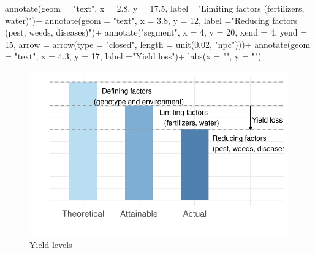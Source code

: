 \documentclass[
  letterpaper,
  DIV=11,
  numbers=noendperiod]{scrreprt}
\newenvironment{Shaded}{\begin{snugshade}}{\end{snugshade}}
\newcommand{\AttributeTok}[1]{\textcolor[rgb]{0.40,0.45,0.13}{#1}}
\newcommand{\DecValTok}[1]{\textcolor[rgb]{0.68,0.00,0.00}{#1}}
\newcommand{\FloatTok}[1]{\textcolor[rgb]{0.68,0.00,0.00}{#1}}
\newcommand{\FunctionTok}[1]{\textcolor[rgb]{0.28,0.35,0.67}{#1}}
\newcommand{\NormalTok}[1]{\textcolor[rgb]{0.00,0.23,0.31}{#1}}
\newcommand{\SpecialCharTok}[1]{\textcolor[rgb]{0.37,0.37,0.37}{#1}}
\newcommand{\StringTok}[1]{\textcolor[rgb]{0.13,0.47,0.30}{#1}}
\begin{document}
\begin{Shaded}
\begin{Highlighting}[]
  \FunctionTok{annotate}\NormalTok{(}\AttributeTok{geom =} \StringTok{"text"}\NormalTok{, }\AttributeTok{x =} \FloatTok{2.8}\NormalTok{, }\AttributeTok{y =} \FloatTok{17.5}\NormalTok{, }\AttributeTok{label =}\StringTok{"Limiting factors}
\StringTok{        (fertilizers, water)"}\NormalTok{)}\SpecialCharTok{+}
  \FunctionTok{annotate}\NormalTok{(}\AttributeTok{geom =} \StringTok{"text"}\NormalTok{, }\AttributeTok{x =} \FloatTok{3.8}\NormalTok{, }\AttributeTok{y =} \DecValTok{12}\NormalTok{, }\AttributeTok{label =}\StringTok{"Reducing factors}
\StringTok{           (pest, weeds, diseases)"}\NormalTok{)}\SpecialCharTok{+}
  \FunctionTok{annotate}\NormalTok{(}\StringTok{"segment"}\NormalTok{, }\AttributeTok{x =} \DecValTok{4}\NormalTok{, }\AttributeTok{y =} \DecValTok{20}\NormalTok{, }\AttributeTok{xend =} \DecValTok{4}\NormalTok{, }\AttributeTok{yend =} \DecValTok{15}\NormalTok{,}
         \AttributeTok{arrow =} \FunctionTok{arrow}\NormalTok{(}\AttributeTok{type =} \StringTok{"closed"}\NormalTok{, }\AttributeTok{length =} \FunctionTok{unit}\NormalTok{(}\FloatTok{0.02}\NormalTok{, }\StringTok{"npc"}\NormalTok{)))}\SpecialCharTok{+}
  \FunctionTok{annotate}\NormalTok{(}\AttributeTok{geom =} \StringTok{"text"}\NormalTok{, }\AttributeTok{x =} \FloatTok{4.3}\NormalTok{, }\AttributeTok{y =} \DecValTok{17}\NormalTok{, }\AttributeTok{label =}\StringTok{"Yield loss"}\NormalTok{)}\SpecialCharTok{+}
  \FunctionTok{labs}\NormalTok{(}\AttributeTok{x =} \StringTok{""}\NormalTok{, }\AttributeTok{y =} \StringTok{""}\NormalTok{)}
\end{Highlighting}
\end{Shaded}

\begin{figure}[H]

{\centering \includegraphics{yieldloss-concepts_files/figure-pdf/fig-yield-1.pdf}

}

\caption{\label{fig-yield}Yield levels}

\end{figure}
\end{document}
